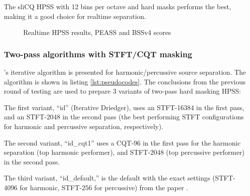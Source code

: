 \documentclass[letter,12pt]{article}
\newenvironment{tight_enumerate}{
\begin{enumerate}
  \setlength{\itemsep}{0pt}
  \setlength{\parskip}{0pt}
}{\end{enumerate}}
\begin{document}
The sliCQ HPSS with 12 bins per octave and hard masks performs the best, making it a good choice for realtime separation.

\begin{figure}[ht]
	\centering
	\vspace{1em}
	\caption{Realtime HPSS results, PEASS and BSSv4 scores}
	\label{fig:rtresults}
\end{figure}

\vfill
\clearpage

\subsubsection{Two-pass algorithms with STFT/CQT masking}

\citet{driedger}'s iterative algorithm is presented for harmonic/percussive source separation. The algorithm is shown in listing \ref{lst:pseudocodes}. The conclusions from the previous round of testing are used to prepare 3 variants of two-pass hard masking HPSS:
\begin{tight_enumerate}
	\item
		The first variant, ``id'' (Iterative Driedger), uses an STFT-16384 in the first pass, and an STFT-2048 in the second pass (the best performing STFT configurations for harmonic and percussive separation, respectively).
	\item
		The second variant, ``id\_cqt1'' uses a CQT-96 in the first pass for the harmonic separation (top harmonic performer), and STFT-2048 (top percussive performer) in the second pass.
	\item
		The third variant, ``id\_default,'' is the default with the exact settings (STFT-4096 for harmonic, STFT-256 for percussive) from the paper \cite{driedger}.
\end{tight_enumerate}
\end{document}
